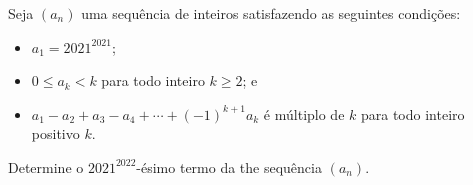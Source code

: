 Seja $(a_n)$ uma sequência de inteiros satisfazendo as seguintes condições:
\begin{itemize}
	\item $a_1=2021^{2021}$;
	\item $0 \le a_k < k$ para todo inteiro $k \ge 2$; e
	\item $a_1-a_2+a_3-a_4+ \cdots + (-1)^{k+1}a_k$ é múltiplo de $k$ para todo inteiro positivo $k$.
\end{itemize}
Determine o $2021^{2022}$-ésimo termo da the sequência $(a_n)$.

